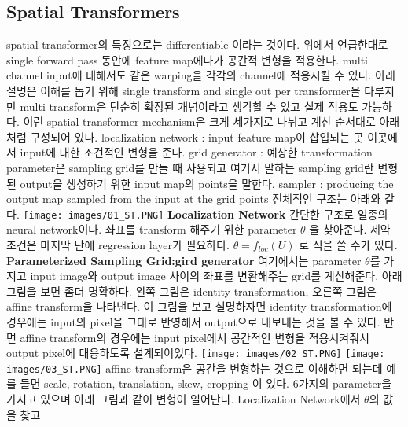\documentclass[extendedabs]{bmvc2k}
\begin{document}
 \subsection{Spatial Transformers}
 \quad spatial transformer의 특징으로는 differentiable 이라는 것이다. 위에서 언급한대로 single forward pass 동안에 feature map에다가 공간적 변형을 적용한다.
 multi channel input에 대해서도 같은 warping을 각각의 channel에 적용시킬 수 있다. 아래 설명은 이해를 돕기 위해 single transform and single out per transformer을
 다루지만 multi transform은 단순히 확장된 개념이라고 생각할 수 있고 실제 적용도 가능하다. 이런 spatial transformer mechanism은 크게 세가지로 나뉘고 계산 순서대로 아래처럼 구성되어 있다.
 \newline localization network : input feature map이 삽입되는 곳 이곳에서 input에 대한 조건적인 변형을 준다.
 \newline grid generator : 예상한 transformation parameter은 sampling grid를 만들 때 사용되고 여기서 말하는 sampling grid란 변형된 output을 생성하기 위한 input map의 points을 말한다. 
 \newline sampler : producing the output map sampled from the input at the grid points
 \newline 전체적인 구조는 아래와 같다.
 \newline  \texttt{[image: images/01\_ST.PNG]}
 \textbf{Localization Network} 간단한 구조로 일종의 neural network이다. 좌표를 transform 해주기 위한 parameter $\theta$ 을 찾아준다.
 제약 조건은 마지막 단에 regression layer가 필요하다. $ \theta = f_{loc}(U)$ 로 식을 쓸 수가 있다.
 \newline  \textbf{Parameterized Sampling Grid:gird generator} 여기에서는 parameter $\theta$를 가지고 input image와 output image 사이의 좌표를 변환해주는
 grid를 계산해준다. 아래그림을 보면 좀더 명확하다. 왼쪽 그림은 identity transformation, 오른쪽 그림은 affine transform을 나타낸다. 
 이 그림을 보고 설명하자면 identity transformation에 경우에는 input의 pixel을 그대로 반영해서 output으로 내보내는 것을 볼 수 있다. 반면
 affine transform의 경우에는 input pixel에서 공간적인 변형을 적용시켜줘서 output pixel에 대응하도록 설계되어있다.
 \newline  \texttt{[image: images/02\_ST.PNG]} \texttt{[image: images/03\_ST.PNG]}
 \newline affine transform은 공간을 변형하는 것으로 이해하면 되는데 예를 들면
 scale, rotation, translation, skew, cropping 이 있다. 6가지의 parameter을 가지고 있으며 아래 그림과 같이 변형이 일어난다. Localization Network에서 $\theta$의 값을 찾고
\end{document}
